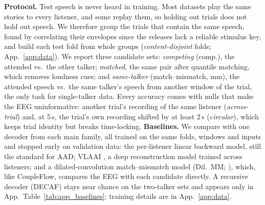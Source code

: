 \documentclass[10pt,twocolumn,letterpaper]{article}
\begin{document}
\textbf{Protocol.} Test speech is never heard in training. Most datasets play the same
stories to every listener, and some replay them, so holding out trials does not hold out
speech. We therefore group the trials that contain the same speech, found by correlating
their envelopes since the releases lack a reliable stimulus key, and build each test fold
from whole groups (\emph{content-disjoint} folds; App.~\ref{app:data}). We report three
candidate sets: \emph{competing} (comp.), the attended vs.\ the other talker; \emph{matched},
the same pair after quantile matching, which removes loudness cues; and \emph{same-talker}
(match--mismatch, mm), the attended speech vs.\ the same talker's speech from another window
of the trial, the only task for single-talker data. Every accuracy comes with nulls that
make the EEG uninformative: another trial's recording of the same listener
(\emph{across-trial}) and, at 5\,s, the trial's own recording shifted by at least 2\,s
(\emph{circular}), which keeps trial identity but breaks time-locking.
\textbf{Baselines.} We compare with one decoder from each main family, all trained on the
same folds, windows and inputs and stopped early on validation data: the per-listener linear
backward model, still the standard for AAD; VLAAI \citep{accou2023vlaai}, a deep
reconstruction model trained across listeners; and a dilated-convolution match--mismatch
model (Dil.\ MM; \citealp{accou2021dilated}), which, like CoupleFlow, compares the EEG with
each candidate directly. A recursive decoder (DECAF) stays near chance on the two-talker sets
and appears only in App.~Table~\ref{tab:app_baselines}; training details are in
App.~\ref{app:data}.

\begin{table}[!t]\centering\small
\caption{Accuracy (\%) of CoupleFlow (Ours) and the baselines at 1, 5 and 20\,s on the
content-disjoint folds (every model trained and tested on the same folds), and on unseen
listeners (LOSO: listener and content held out, 5\,s) against the pooled linear backward
model. comp.: attended vs.\ competing talker; mm: match--mismatch. Ours: mean of 3 seeds
(s.d.\ \sdMin--\sdMax{} at 5\,s); LOSO: one seed. Bold: best per group. CoupleFlow's
EEG-shuffle nulls lie in [\nullShortMin, \nullShortMax] up to 10\,s. All windows and per-trial accuracy: App.~Table~\ref{tab:app_baselines};
full LOSO results: App.~Table~\ref{tab:loso}.}\label{tab:main}
\setlength{\tabcolsep}{3.2pt}
\resizebox{\textwidth}{!}{}
\end{table}
\end{document}
